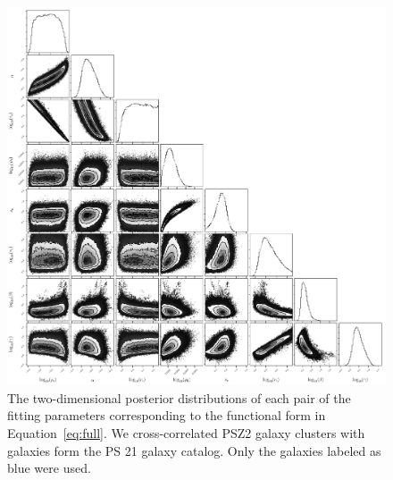 \documentclass[iop, apjl, twocolappendix, numberedappendix]{emulateapj}
\begin{document}
\begin{figure}
    \includegraphics[width= \textwidth]{cornerblue.pdf}
\caption{The two-dimensional posterior distributions of each pair of
the fitting parameters corresponding to the functional
form in Equation~\ref{eq:full}. We cross-correlated PSZ2 galaxy clusters with
galaxies form the PS 21 galaxy catalog. Only the galaxies labeled as
blue were used.}
   \label{fig:cornerblue} 
\end{figure}

\label{lastpage}
\end{document}
